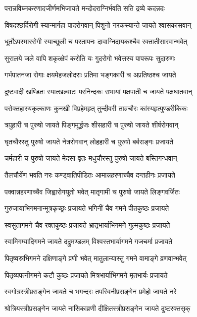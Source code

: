 \twolineshloka
{परान्नविघ्नकरणादजीर्णमभिजायते}
{मन्दोदराग्निर्भवति सति द्रव्ये कदन्नदः}%

\twolineshloka
{विषदश्छर्दिरोगी स्यान्मार्गहा पादरोगवान्}
{पिशुनो नरकस्यान्ते जायते श्वासकासवान्}%

\twolineshloka
{धूर्तोऽपस्माररोगी स्याच्छूली च परतापनः}
{दावाग्निदायकश्चैव रक्तातीसारवान्भवेत्}%

\twolineshloka
{सुरालये जले वापि शकृत्क्षेपं करोति यः}
{गुदरोगो भवेत्तस्य पापरूपः सुदारुणः}%

\twolineshloka
{गर्भपातनजा रोगाः क्षयमेहजलोदराः}
{प्रतिमा भङ्गकारी च अप्रतिष्ठश्च जायते}%

\twolineshloka
{दुष्टवादी खण्डितः स्यात्खल्वाटः परनिन्दकः}
{सभायां पक्षपाती च जायते पक्षघातवान्}%

\twolineshloka
{परोक्तहास्यकृत्काणः कुनखी विप्रहेमहृत्}
{तुन्दीवरी ताम्रचौरः कांस्यहृत्पुण्डरीकिकः}%

\twolineshloka
{त्रपुहारी च पुरुषो जायते पिङ्गमूर्द्धजः}
{शीसहारी च पुरुषो जायते शीर्षरोगवान्}%

\twolineshloka
{घृतचौरस्तु पुरुषो जायते नेत्ररोगवान्}
{लोहहारी च पुरुषो बर्बराङ्गः प्रजायते}%

\twolineshloka
{चर्महारी च पुरुषो जायते मेदसा वृतः}
{मधुचौरस्तु पुरुषो जायते बस्तिगन्धवान्}%

\twolineshloka
{तैलचौर्येण भवति नरः कण्ड्वातिपीडितः}
{आमान्नहरणाच्चैव दन्तहीनः प्रजायते}%

\twolineshloka
{पक्वान्नहरणाच्चैव जिह्वारोगयुतो भवेत्}
{मातृगामी च पुरुषो जायते लिङ्गवर्जितः}%

\twolineshloka
{गुरुजायाभिगमनान्मूत्रकृच्छ्रः प्रजायते}
{भगिनीं चैव गमने पीतकुष्ठः प्रजायते}%

\twolineshloka
{स्वसुतागमने चैव रक्तकुष्ठः प्रजायते}
{भ्रातृभार्याभिगमने गुल्मकुष्ठः प्रजायते}%

\twolineshloka
{स्वामिगम्यादिगमने जायते दद्रुमण्डलम्}
{विश्वस्तभार्यागमने गजचर्मा प्रजायते}%

\twolineshloka
{पितृष्वस्रभिगमने दक्षिणाङ्गे व्रणी भवेत्}
{मातुलान्यास्तु गमने वामाङ्गे व्रणवान्भवेत्}%

\twolineshloka
{पितृव्यपत्नीगमने कटौ कुष्ठः प्रजायते}
{मित्रभार्याभिगमने मृतभार्यः प्रजायते}%

\twolineshloka
{स्वगोत्रस्त्रीप्रसङ्गेन जायते च भगन्दरः}
{तपस्विनीप्रसङ्गेन प्रमेहो जायते नरे}%

\twolineshloka
{श्रोत्रियस्त्रीप्रसङ्गेन जायते नासिकाव्रणी}
{दीक्षितस्त्रीप्रसङ्गेन जायते दुष्टरक्तसृक्}%

